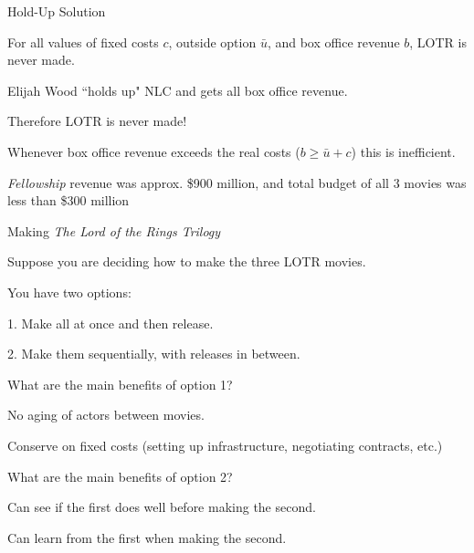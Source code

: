 \documentclass[aspectratio=169,usenames,dvipsnames]{beamer}
\newenvironment{wideitemize}{\itemize\addtolength{\itemsep}{10pt}}{\enditemize}
\begin{document}
\begin{frame}{Hold-Up Solution}

\begin{theorem}
    For all values of fixed costs $c$, outside option $\bar u$, and box office revenue $b$, LOTR is never made.
\end{theorem}

\begin{wideitemize}
    \item Elijah Wood ``holds up" NLC and gets all box office revenue.
    \item Therefore LOTR is never made!
    \item Whenever box office revenue exceeds the real costs ($b \geq \bar u +c$) this is inefficient.
    \item \textit{Fellowship} revenue was approx. \$900 million, and total budget of all 3 movies was less than \$300 million
\end{wideitemize}
    
\end{frame}


\begin{frame}{Making \textit{The Lord of the Rings Trilogy}}

\begin{wideitemize}
    \item Suppose you are deciding how to make the three LOTR movies.
    \item You have two options:\pause
    \begin{wideitemize}
        \item[1.] Make all at once and then release.\pause
        \item[2.] Make them sequentially, with releases in between.
    \end{wideitemize}
    \item What are the main benefits of option 1?
    \begin{wideitemize}
        \item No aging of actors between movies.
        \item Conserve on fixed costs (setting up infrastructure, negotiating contracts, etc.)
    \end{wideitemize}
    \item What are the main benefits of option 2?
    \begin{wideitemize}
        \item Can see if the first does well before making the second.
        \item Can learn from the first when making the second.
    \end{wideitemize}
    
\end{wideitemize}
    
\end{frame}
\end{document}
